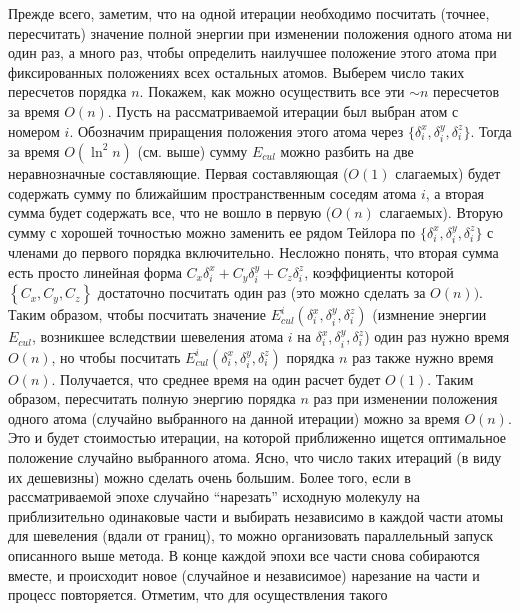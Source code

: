   Прежде всего, заметим, что на одной итерации необходимо посчитать (точнее, 
  пересчитать) значение полной энергии при изменении положения одного атома ни 
  один раз, а много раз, чтобы определить наилучшее положение этого атома при 
  фиксированных положениях всех остальных атомов. Выберем число таких 
  пересчетов порядка $n$. Покажем, как можно осуществить все эти $\sim n$ 
  пересчетов за время ${O}\left( n \right)$. Пусть на рассматриваемой 
  итерации был выбран атом с номером $i$. Обозначим приращения положения этого 
  атома через $\{\delta _i^x ,\delta _i^y ,\delta _i^z \}$. Тогда за время 
  ${O}\left( {\ln ^2n} \right)$ (см. выше) сумму $E_{cul}$ можно разбить на две 
  неравнозначные составляющие. Первая составляющая (${O}\left( 1 \right)$ 
  слагаемых) будет содержать сумму по ближайшим пространственным соседям атома 
  $i$, а вторая сумма будет содержать все, что не вошло в первую (${
  O}\left( n \right)$ слагаемых). Вторую сумму с хорошей точностью можно 
  заменить ее рядом Тейлора по $\{\delta _i^x ,\delta _i^y ,\delta _i^z \}$ с 
  членами до первого порядка включительно. 
  Несложно понять, что вторая сумма есть просто линейная форма 
  $C_x \delta _i^x + C_y \delta _i^y +C_z \delta _i^z $, коэффициенты которой 
  $\left\{ {C_x ,C_y ,C_z } \right\}$ достаточно посчитать один раз (это можно 
  сделать за ${O}\left( n \right))$. Таким образом, чтобы посчитать 
  значение $E_{cul}^i \left( {\delta _i^x ,\delta _i^y ,\delta _i^z } 
  \right)$ (измнение энергии $E_{cul}$, возникшее вследствии шевеления атома $i$ на ${\delta _i^x ,\delta _i^y ,\delta _i^z }$) один раз нужно время ${O}\left( n \right)$, но чтобы посчитать 
  $E_{cul}^i \left( {\delta _i^x ,\delta _i^y ,\delta _i^z } \right)$ порядка 
  $n$ раз также нужно время ${O}\left( n \right)$. Получается, что среднее 
  время на один расчет будет ${O}\left( 1 \right)$. Таким образом, 
  пересчитать полную энергию порядка $n$ раз при изменении положения одного 
  атома (случайно выбранного на данной итерации) можно за время ${O}\left( 
  n \right)$. Это и будет стоимостью итерации, на которой приближенно ищется 
  оптимальное положение случайно выбранного атома. Ясно, что число таких 
  итераций (в виду их дешевизны) можно сделать очень большим. Более того, если 
  в рассматриваемой эпохе случайно ``нарезать'' исходную молекулу на 
  приблизительно одинаковые части и выбирать независимо в каждой части атомы 
  для шевеления (вдали от границ), то можно организовать параллельный запуск 
  описанного выше метода. В конце каждой эпохи все части снова собираются 
  вместе, и происходит новое (случайное и независимое) нарезание на части и процесс повторяется. Отметим, что для осуществления такого 
